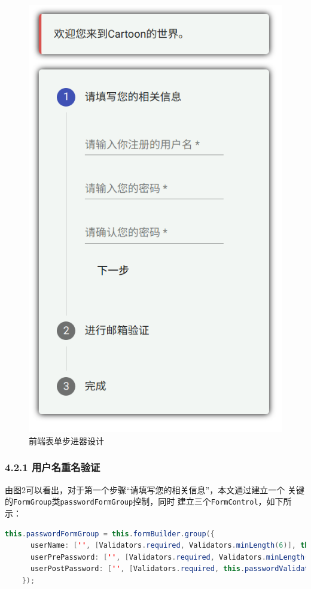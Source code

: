 \documentclass[a4paper,12pt, centering]{ctexart}
\begin{document}
  \begin{figure}[h]
    \centering
    \includegraphics{1.png}
    \caption{前端表单步进器设计}
  \end{figure}

  \subsubsection*{4.2.1 用户名重名验证}
  由图2可以看出，对于第一个步骤“请填写您的相关信息”，本文通过建立一个
  关键的\verb|FormGroup|类\verb|passwordFormGroup|控制，同时
  建立三个\verb|FormControl|，如下所示：

  \begin{lstlisting}[language=java, caption=响应式表单代码]
    this.passwordFormGroup = this.formBuilder.group({
      userName: ['', [Validators.required, Validators.minLength(6)], this.userNameValidators],
      userPrePassword: ['', [Validators.required, Validators.minLength(6)]],
      userPostPassword: ['', [Validators.required, this.passwordValidators]],
    });
  \end{lstlisting}
\end{document}

